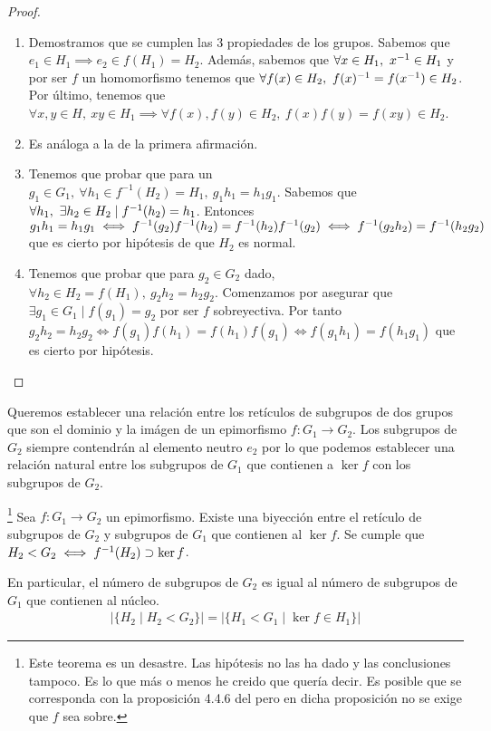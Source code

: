 \begin{proof}$ $\newline
	\begin{enumerate}
		\item Demostramos que se cumplen las 3 propiedades de los grupos. Sabemos que $e_1 \in H_1 \implies e_2 \in f(H_1) = H_2$. Además, sabemos que $\forall x \in H_1,\ \inv{x} \in H_1$ y por ser $f$ un homomorfismo tenemos que $\forall f(x) \in H_2,\ f(x)^{-1} = f(x^{-1}) \in H_2$. Por último, tenemos que $\forall x,y \in H,\ xy \in H_1 \implies \forall f(x),f(y) \in H_2,\ f(x)f(y) = f(xy) \in H_2$.
		\item Es análoga a la de la primera afirmación.
		\item Tenemos que probar que para un $g_1 \in G_1,\ \forall h_1 \in f^{-1}(H_2) = H_1,\ g_1 h_1 = h_1 g_1$. Sabemos que $\forall h_1,\ \exists h_2 \in H_2 \mid f^{-1}(h_2) = h_1$. Entonces $g_1h_1 = h_1 g_1 \iff f^{-1}(g_2)f^{-1}(h_2) = f^{-1}(h_2)f^{-1}(g_2) \iff f^{-1}(g_2h_2) = f^{-1}(h_2g_2)$ que es cierto por hipótesis de que $H_2$ es normal.
		\item Tenemos que probar que para $g_2 \in G_2$ dado, $\forall h_2 \in H_2 = f(H_1),\ g_2h_2 = h_2g_2$. Comenzamos por asegurar que $\exists g_1 \in G_1 \mid f(g_1) = g_2$ por ser $f$ sobreyectiva. Por tanto $g_2h_2 = h_2 g_2 \iff f(g_1)f(h_1) = f(h_1)f(g_1) \iff f(g_1h_1) = f(h_1g_1)$ que es cierto por hipótesis.
	\end{enumerate}
\end{proof}

Queremos establecer una relación entre los retículos de subgrupos de dos grupos que son el dominio y la imágen de un epimorfismo $f: G_1 \to G_2$. Los subgrupos de $G_2$ siempre contendrán al elemento neutro $e_2$ por lo que podemos establecer una relación natural entre los subgrupos de $G_1$ que contienen a $\ker f$ con los subgrupos de $G_2$.

\begin{thm}\footnote{Este teorema es un desastre. Las hipótesis no las ha dado y las conclusiones tampoco. Es lo que más o menos he creido que quería decir. Es posible que se corresponda con la proposición 4.4.6 del \cite{dor96} pero en dicha proposición no se exige que $f$ sea sobre.}
	Sea $f: G_1 \to G_2$ un epimorfismo. Existe una biyección entre el retículo de subgrupos de $G_2$ y subgrupos de $G_1$ que contienen al $\ker f$. Se cumple que $H_2 < G_2 \iff f^{-1}(H_2) \supset \ker f$.
	
	En particular, el número de subgrupos de $G_2$ es igual al número de subgrupos de $G_1$ que contienen al núcleo.
	\begin{align*}
		|\{H_2 \mid H_2 < G_2\}| = |\{H_1 < G_1 \mid \ker f \in H_1\}|
	\end{align*}
\end{thm}

